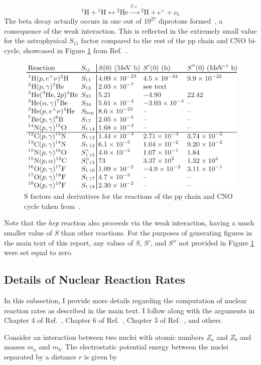 \documentclass[12pt]{article}
\begin{document}
\begin{equation}
    ^1 \mathrm{H} +\text{} ^1\mathrm{H} \longleftrightarrow \text{} ^2\mathrm{He} \stackrel{\beta+}{\longrightarrow}\text{} ^2\mathrm{H} + e^+ + \nu_\mathrm{e}
\end{equation}
%
The beta decay actually occurs in one out of $10^{27}$ diprotons formed~\cite{Cox_Giuli_vol1}, a consequence of the weak interaction. This is reflected in the extremely small value for the astrophysical $S_{11}$ factor compared to the rest of the pp chain and CNO bi-cycle, showcased in Figure \ref{fig:s_table} from Ref.~\cite{Acharya2024}.

\begin{figure}[H]
    \centering
    \includegraphics[width=0.75\linewidth]{Appendices//Nuclear Fusion/S_factors.png}
    \caption{S factors and derivatives for the reactions of the pp chain and CNO cycle taken from~\cite{Acharya2024}.}
    \label{fig:s_table}
\end{figure}

Note that the \textit{hep} reaction also proceeds via the weak interaction, having a much smaller value of $S$ than other reactions. For the purposes of generating figures in the main text of this report, any values of $S$, $S'$, and $S''$ not provided in Figure \ref{fig:s_table} were set equal to zero.

\subsection{Details of Nuclear Reaction Rates} \label{ap:rates}
In this subsection, I provide more details regarding the computation of nuclear reaction rates as described in the main text. I follow along with the arguments in Chapter 4 of Ref.~\cite{Phillips1999}, Chapter 6 of Ref.~\cite{HK_book}, Chapter 3 of Ref.~\cite{Rolfs1988}, and others.

Consider an interaction between two nuclei with atomic numbers $Z_a$ and $Z_b$ and masses $m_a$ and $m_b$. The electrostatic potential energy between the nuclei separated by a distance $r$ is given by
\end{document}

